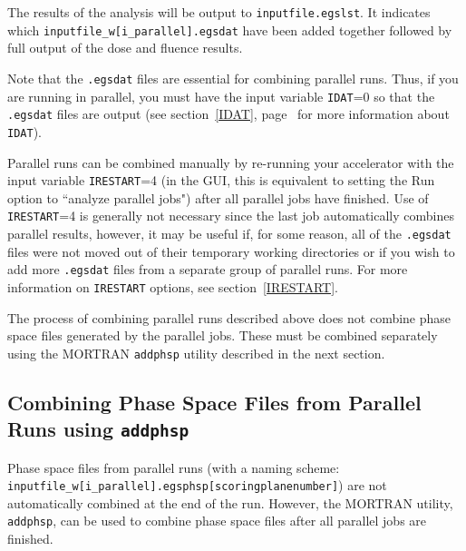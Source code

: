 \documentclass[12pt,twoside]{article}
\begin{document}
The results of the analysis will be output to {\tt inputfile.egslst}.
It
indicates which {\tt inputfile\_w[i\_parallel].egsdat} have
been added together followed by full output of the
dose and fluence results.

Note that the {\tt .egsdat} files are essential for combining
parallel runs.  Thus, if you are running in parallel, you must have
the input variable {\tt IDAT}=0 so that the {\tt .egsdat} files
are output (see section~\ref{IDAT}, page~\pageref{IDAT} for more
information about {\tt IDAT}).

Parallel runs can be combined manually by re-running your accelerator
with the input variable {\tt IRESTART}=4 (in the GUI, this is equivalent
to setting the Run option to ``analyze parallel jobs") after all parallel
jobs have finished.  Use of {\tt IRESTART}=4 is generally not necessary
since the last job automatically combines parallel results, however,
it may be useful if, for some reason, all of the {\tt .egsdat} files were
not moved out of their temporary working directories or if you wish to
add more {\tt .egsdat} files from a separate group of parallel runs.
For more information on {\tt IRESTART} options, see section~\ref{IRESTART}.

The process of combining parallel runs described above does not
combine phase space files generated by the parallel jobs.  These
must be combined separately using the MORTRAN {\tt addphsp} utility
described in the next section.

\subsection{Combining Phase Space Files from Parallel Runs using {\tt addphsp}}
\label{addphspsect}

Phase space files from parallel runs (with a naming scheme: \\
{\tt inputfile\_w[i\_parallel].egsphsp[scoringplanenumber]})
are not automatically combined at the end of the run.
However, the MORTRAN utility, {\tt addphsp}, can be used to combine
phase space files after all parallel jobs are finished.
\end{document}
